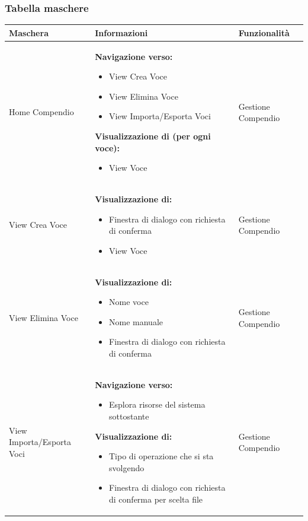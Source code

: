 \documentclass[a4paper, 11pt]{article}
\begin{document}
\subsubsection*{Tabella maschere}
\begin{adjustwidth}{-1.5cm}{-1.5cm}
    \begin{center}
        \begin{longtable}{|p{5cm}|p{5cm}|p{5cm}|}
        \hline
        \textbf{Maschera} & \textbf{Informazioni} & \textbf{Funzionalità} \\ \hline
        Home Compendio & 
        \textbf{Navigazione verso:} 
        \begin{itemize}
            \item View Crea Voce 
            \item View Elimina Voce 
            \item View Importa/Esporta Voci
        \end{itemize}
        \textbf{Visualizzazione di (per ogni voce):}
        \begin{itemize}
            \item View Voce
        \end{itemize} & 
        Gestione Compendio \\ \hline
        
        View Crea Voce & 
        \textbf{Visualizzazione di:}
        \begin{itemize}
            \item Finestra di dialogo con richiesta di conferma
            \item View Voce
        \end{itemize} & 
        Gestione Compendio \\ \hline
        
        View Elimina Voce & 
        \textbf{Visualizzazione di:}
        \begin{itemize}
            \item Nome voce
            \item Nome manuale
            \item Finestra di dialogo con richiesta di conferma
        \end{itemize} & 
        Gestione Compendio \\ \hline
        
        View Importa/Esporta Voci & 
        \textbf{Navigazione verso:}
        \begin{itemize}
            \item Esplora risorse del sistema sottostante
        \end{itemize}
        \textbf{Visualizzazione di:}
        \begin{itemize}
            \item Tipo di operazione che si sta svolgendo
            \item Finestra di dialogo con richiesta di conferma per scelta file
        \end{itemize} & 
        Gestione Compendio \\ \hline
        

\end{longtable}
\end{center}
\end{adjustwidth}
\end{document}
